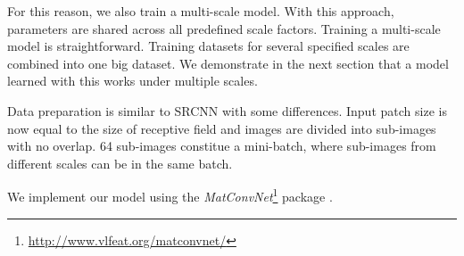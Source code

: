 \documentclass[10pt,twocolumn,letterpaper]{article}
\begin{document}
For this reason, we also train a multi-scale model. With this approach, parameters are shared across all predefined scale factors. Training a multi-scale model is straightforward. Training datasets for several specified scales are combined into one big dataset. We demonstrate in the next section that a model learned with this works under multiple scales.

Data preparation is similar to SRCNN \cite{Dong2014} with some differences. Input patch size is now equal to the size of receptive field and images are divided into sub-images with no overlap. 64 sub-images constitue a mini-batch, where sub-images from different scales can be in the same batch.

We implement our model using the \textit{MatConvNet}\footnote{\url{ http://www.vlfeat.org/matconvnet/}} package \cite{arXiv:1412.4564}.
\end{document}
